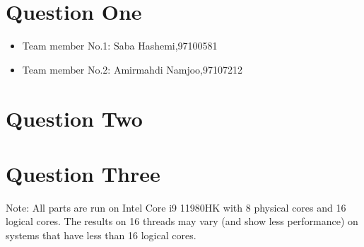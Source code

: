 \documentclass[12pt]{article}
\begin{document}
\section{Question One}

\begin{itemize}
	
	\item Team member No.1: Saba Hashemi,97100581
	\item Team member No.2: Amirmahdi Namjoo,97107212
\end{itemize}

\newpage

\section{Question Two}


\newpage

\section{Question Three}

Note: All parts are run on Intel Core i9 11980HK with 8 physical cores and 16 logical cores. The results on 16 threads may vary (and show less performance) on systems that have less than 16 logical cores.
\end{document}
